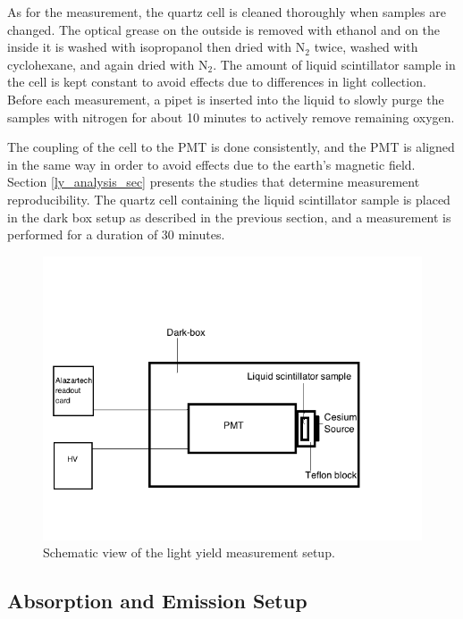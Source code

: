 \documentclass{JINST}
\begin{document}
 As for the measurement, the quartz cell is cleaned thoroughly when samples are changed. The optical grease on the outside is removed with ethanol and on the inside it is washed with isopropanol then dried with N$_{2}$ twice, washed with cyclohexane, and again dried with N$_{2}$. The amount of liquid scintillator sample in the cell is kept constant to avoid effects due to differences in light collection. Before each measurement, a pipet is inserted into the liquid to slowly purge the samples with nitrogen for about 10 minutes to actively remove remaining oxygen. 

The coupling of the cell to the PMT is done consistently, and the PMT is aligned in the same way in order to avoid effects due to the earth's magnetic field. Section \ref{ly_analysis_sec} presents the studies that determine measurement reproducibility.  The quartz cell containing the liquid scintillator sample is placed in the dark box setup as described in the previous section, and a measurement is performed for a duration of 30 minutes.
 
\begin{figure}[tbh]
        \begin{center}
        \includegraphics[scale=0.6]{graphs/Diagram_Darkbox.png}
\caption[]{Schematic view of the light yield measurement setup. \label{setup_fig}}
\end{center}
\end{figure}

\subsection{Absorption and Emission Setup}
\end{document}
